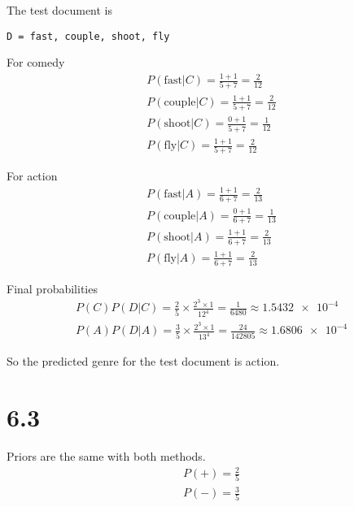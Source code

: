 The test document is
\begin{verbatim}
D = fast, couple, shoot, fly
\end{verbatim}

For comedy
\begin{equation}
  \begin{split}
    P(\text{fast}|C) = \frac{1+1}{5+7} = \frac{2}{12} \\
    P(\text{couple}|C) = \frac{1+1}{5+7} = \frac{2}{12} \\
    P(\text{shoot}|C) = \frac{0+1}{5+7} = \frac{1}{12} \\
    P(\text{fly}|C) = \frac{1+1}{5+7} = \frac{2}{12}
  \end{split}
\end{equation}

For action
\begin{equation}
  \begin{split}
    P(\text{fast}|A) = \frac{1+1}{6+7} = \frac{2}{13} \\
    P(\text{couple}|A) = \frac{0+1}{6+7} = \frac{1}{13} \\
    P(\text{shoot}|A) = \frac{1+1}{6+7} = \frac{2}{13} \\
    P(\text{fly}|A) = \frac{1+1}{6+7} = \frac{2}{13}
  \end{split}
\end{equation}

Final probabilities
\begin{equation}
  \begin{split}
    P(C)P(D|C) = \frac{2}{5} \times \frac{2^3 \times 1}{12^4} = \frac{1}{6480}
    \approx \num{1.5432e-4}\\
    P(A)P(D|A) = \frac{3}{5} \times \frac{2^3 \times 1}{13^4} =
    \frac{24}{142805} \approx \num{1.6806e-4}
  \end{split}
\end{equation}

So the predicted genre for the test document is action.
         
         
\section*{6.3}
Priors are the same with both methods.
\begin{equation}
  \begin{split}
    P(+) = \frac{2}{5} \\
    P(-) = \frac{3}{5}
  \end{split}
\end{equation}

